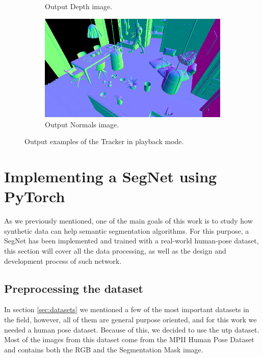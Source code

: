 \begin{figure}
\begin{subfigure}[b]{0.475\textwidth}
		\caption[Output Depth image.]%
		{{\small Output Depth image.}}    
		\label{fig:generated_depth}
	\end{subfigure}
	\quad
	\begin{subfigure}[b]{0.475\textwidth}   
		\centering 
		\includegraphics[width=\textwidth]{archivos/generated_normals.png}
		\caption[Output Normals image.]%
		{{\small Output Normals image.}}    
		\label{fig:generated_normals}
	\end{subfigure}
	\caption{Output examples of the Tracker in playback mode.}
	\label{fig:playback_output}
\end{figure}

\section{Implementing a SegNet using PyTorch}
\label{sec:segnet}
As we previously mentioned, one of the main goals of this work is to study how synthetic data can help semantic segmentation algorithms. For this purpose, a SegNet has been implemented and trained with a real-world human-pose dataset, this section will cover all the data processing, as well as the design and development process of such network.

\subsection{Preprocessing the dataset}
\label{sec:preprocess}
In section \ref{sec:datasets} we mentioned a few of the most important datasets in the field, however, all of them are general purpose oriented, and for this work we needed a human pose dataset. Because of this, we decided to use the \gls{utp} \cite{} dataset. Most of the images from this dataset come from the MPII Human Pose Dataset and contains both the RGB and the Segmentation Mask image.

